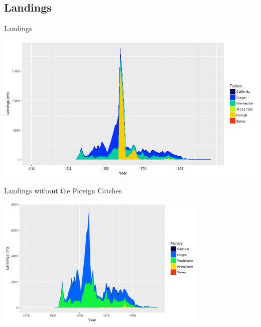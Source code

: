 \documentclass[pdf]{beamer}\usepackage[]{graphicx}\usepackage[]{color}
\begin{document}
\subsection{Landings}
\begin{frame}{Landings}
  \begin{center}
    \includegraphics[scale = 0.40]{figures/catches.png}
  \end{center}
\end{frame}

\begin{frame}{Landings without the Foreign Catches}
  \begin{center}
    \includegraphics[height = 2.5in, width = 4in]{figures/POP_Landings_wo_Foreign.png}
  \end{center}
\end{frame}
\end{document}
